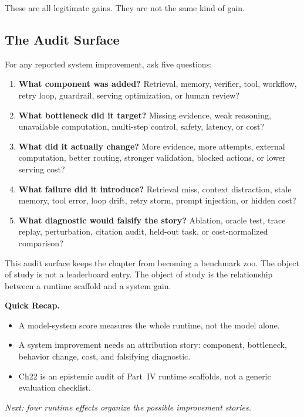 These are all legitimate gains. They are not the same kind of gain.

\subsection{The Audit Surface}

\begin{tcolorbox}[colback=blue!5, colframe=blue!40, title=\textbf{The Model-System Audit Surface}]
For any reported system improvement, ask five questions:
\begin{enumerate}[nosep]
  \item \textbf{What component was added?} Retrieval, memory, verifier, tool, workflow, retry loop, guardrail, serving optimization, or human review?
  \item \textbf{What bottleneck did it target?} Missing evidence, weak reasoning, unavailable computation, multi-step control, safety, latency, or cost?
  \item \textbf{What did it actually change?} More evidence, more attempts, external computation, better routing, stronger validation, blocked actions, or lower serving cost?
  \item \textbf{What failure did it introduce?} Retrieval miss, context distraction, stale memory, tool error, loop drift, retry storm, prompt injection, or hidden cost?
  \item \textbf{What diagnostic would falsify the story?} Ablation, oracle test, trace replay, perturbation, citation audit, held-out task, or cost-normalized comparison?
\end{enumerate}
\end{tcolorbox}

This audit surface keeps the chapter from becoming a benchmark zoo. The object of study is not a leaderboard entry. The object of study is the relationship between a runtime scaffold and a system gain.

\begin{quickrecap}
\textbf{Quick Recap.}
\begin{itemize}[nosep,leftmargin=1.5em]
  \item A model-system score measures the whole runtime, not the model alone.
  \item A system improvement needs an attribution story: component, bottleneck, behavior change, cost, and falsifying diagnostic.
  \item Ch22 is an epistemic audit of Part~IV runtime scaffolds, not a generic evaluation checklist.
\end{itemize}
\textit{Next: four runtime effects organize the possible improvement stories.}
\end{quickrecap}



